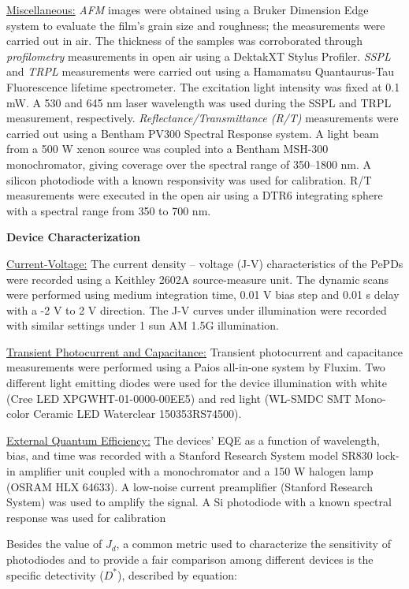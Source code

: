 \underline{Miscellaneous:} \textit{AFM} images were obtained using a Bruker Dimension Edge system to evaluate the film’s grain size and roughness; the measurements were carried out in air. The thickness of the samples was corroborated through \textit{profilometry} measurements in open air using a DektakXT Stylus Profiler. \textit{SSPL} and \textit{TRPL} measurements were carried out using a Hamamatsu Quantaurus-Tau Fluorescence lifetime spectrometer. The excitation light intensity was fixed at 0.1 mW. A 530 and 645 nm laser wavelength was used during the SSPL and TRPL measurement, respectively. \textit{Reflectance/Transmittance (R/T)} measurements were carried out using a Bentham PV300 Spectral Response system. A light beam from a 500 W xenon source was coupled into a Bentham MSH-300 monochromator, giving coverage over the spectral range of 350–1800 nm. A silicon photodiode with a known responsivity was used for calibration. R/T measurements were executed in the open air using a DTR6 integrating sphere with a spectral range from 350 to 700 nm.

\textbf{Device Characterization}

\underline{Current-Voltage:} The current density – voltage (J-V) characteristics of the PePDs were recorded using a Keithley 2602A source-measure unit. The dynamic scans were performed using medium integration time, 0.01 V bias step and 0.01 s delay with a -2 V to 2 V direction. The J-V curves under illumination were recorded with similar settings under 1 sun AM 1.5G illumination. 

\underline{Transient Photocurrent and Capacitance:} Transient photocurrent and capacitance measurements were performed using a Paios all-in-one system by Fluxim. Two different light emitting diodes were used for the device illumination with white (Cree LED XPGWHT-01-0000-00EE5) and red light (WL-SMDC SMT Mono-color Ceramic LED Waterclear 150353RS74500).

\underline{External Quantum Efficiency:} The devices' EQE as a function of wavelength, bias, and time was recorded with a Stanford Research System model SR830 lock-in amplifier unit coupled with a monochromator and a 150 W halogen lamp (OSRAM HLX 64633). A low-noise current preamplifier (Stanford Research System) was used to amplify the signal. A Si photodiode with a known spectral response was used for calibration


Besides the value of $J_d$, a common metric used to characterize the sensitivity of photodiodes and to provide a fair comparison among different devices is the specific detectivity ($D^*$), described by equation: 

